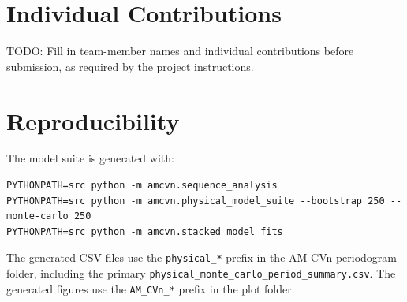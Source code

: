 \documentclass[11pt]{article}
\begin{document}
\appendix
\section{Individual Contributions}

TODO: Fill in team-member names and individual contributions before
submission, as required by the project instructions.

\section{Reproducibility}

The model suite is generated with:
\begin{verbatim}
PYTHONPATH=src python -m amcvn.sequence_analysis
PYTHONPATH=src python -m amcvn.physical_model_suite --bootstrap 250 --monte-carlo 250
PYTHONPATH=src python -m amcvn.stacked_model_fits
\end{verbatim}
The generated CSV files use the \texttt{physical\_*} prefix in the AM CVn
periodogram folder, including the primary
\texttt{physical\_monte\_carlo\_period\_summary.csv}.  The generated figures
use the \texttt{AM\_CVn\_*} prefix in the plot folder.
\end{document}
